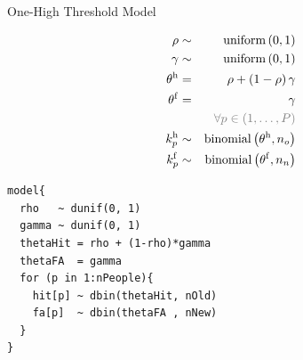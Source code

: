 \documentclass[10pt]{beamer}
\begin{document}
\begin{frame}[fragile]{One-High Threshold Model}

	\begin{minipage}{0.45\textwidth}
		\begin{eqnarray*}
			\rho &\sim& \operatorname{uniform}\left(0, 1\right) \\
			\gamma &\sim&\operatorname{uniform}\left(0, 1\right) \\
			\theta^\mathrm{h} &=& {\rho} + {\left(1-\rho\right)\gamma} \\
			\theta^\mathrm{f} &=& {\gamma} \\
			&&{\color{gray}\forall p \in (1,\ldots,P)}\\
			k^\mathrm{h}_p &\sim& \operatorname{binomial}\left(\theta^\mathrm{h}, n_o\right) \\
			k^\mathrm{f}_p &\sim& \operatorname{binomial}\left(\theta^\mathrm{f}, n_n\right)
		\end{eqnarray*}
	\end{minipage}\hfill
	\begin{minipage}{0.45\textwidth}
		\begin{verbatim}
model{
  rho   ~ dunif(0, 1)
  gamma ~ dunif(0, 1)
  thetaHit = rho + (1-rho)*gamma
  thetaFA  = gamma
  for (p in 1:nPeople){
    hit[p] ~ dbin(thetaHit, nOld)
    fa[p]  ~ dbin(thetaFA , nNew)
  }
}
\end{verbatim}
	\end{minipage}\hspace{1cm}

\end{frame}
\end{document}
